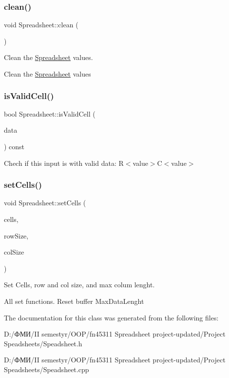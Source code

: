 \subsubsection{\texorpdfstring{clean()}{clean()}}
{\footnotesize\ttfamily void Spreadsheet\+::clean (\begin{DoxyParamCaption}{ }\end{DoxyParamCaption})}



Clean the \hyperlink{class_spreadsheet}{Spreadsheet} values. 

Clean the \hyperlink{class_spreadsheet}{Spreadsheet} values \mbox{\label{class_spreadsheet_a541ce5ddde2c929e67230042434f4d07}} 
\subsubsection{\texorpdfstring{is\+Valid\+Cell()}{isValidCell()}}
{\footnotesize\ttfamily bool Spreadsheet\+::is\+Valid\+Cell (\begin{DoxyParamCaption}\item[{const \hyperlink{class_string}{String}}]{data }\end{DoxyParamCaption}) const}

Chech if this input is with valid data\+: R$<$value$>$C$<$value$>$ \mbox{\label{class_spreadsheet_a8183b9507cf53567b831352f27350688}} 
\subsubsection{\texorpdfstring{set\+Cells()}{setCells()}}
{\footnotesize\ttfamily void Spreadsheet\+::set\+Cells (\begin{DoxyParamCaption}\item[{\hyperlink{class_cell_type}{Cell\+Type} $\ast$$\ast$$\ast$}]{cells,  }\item[{unsigned}]{row\+Size,  }\item[{unsigned}]{col\+Size }\end{DoxyParamCaption})}



Set Cells, row and col size, and max colum lenght. 

All set functions. Reset buffer Max\+Data\+Lenght 

The documentation for this class was generated from the following files\+:\begin{DoxyCompactItemize}
\item 
D\+:/ФМИ/\+I\+I semestyr/\+O\+O\+P/fn45311 Spreadsheet project-\/updated/\+Project Speadsheets/Speadsheet.\+h\item 
D\+:/ФМИ/\+I\+I semestyr/\+O\+O\+P/fn45311 Spreadsheet project-\/updated/\+Project Speadsheets/Speadsheet.\+cpp\end{DoxyCompactItemize}
